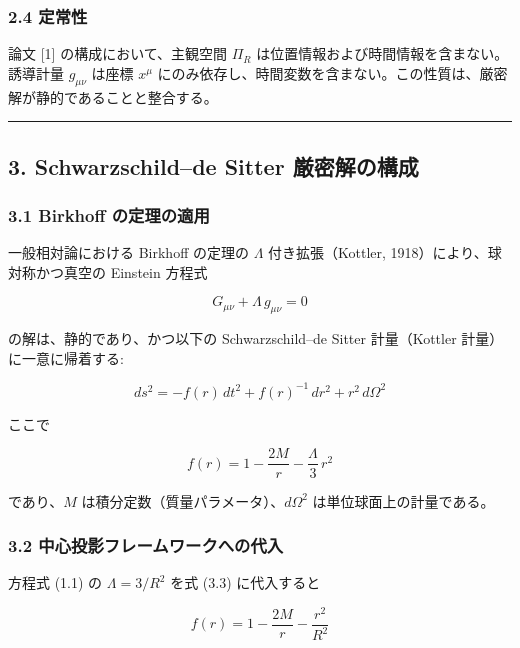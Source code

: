 \documentclass[a4paper,11pt]{ltjsarticle}
\theoremstyle{definition}
\begin{document}
\subsubsection{2.4 定常性}\label{ux5b9aux5e38ux6027}

論文 {[}1{]} の構成において、主観空間 \(\Pi_R\)
は位置情報および時間情報を含まない。誘導計量 \(g_{\mu\nu}\) は座標
\(x^\mu\)
にのみ依存し、時間変数を含まない。この性質は、厳密解が静的であることと整合する。

\begin{center}\rule{0.5\linewidth}{0.5pt}\end{center}

\subsection{3. Schwarzschild--de Sitter
厳密解の構成}\label{schwarzschildde-sitter-ux53b3ux5bc6ux89e3ux306eux69cbux6210}

\subsubsection{3.1 Birkhoff
の定理の適用}\label{birkhoff-ux306eux5b9aux7406ux306eux9069ux7528}

一般相対論における Birkhoff の定理の \(\Lambda\) 付き拡張（Kottler,
1918）により、球対称かつ真空の Einstein 方程式

\[G_{\mu\nu} + \Lambda\, g_{\mu\nu} = 0 \tag{3.1}\]

の解は、静的であり、かつ以下の Schwarzschild--de Sitter 計量（Kottler
計量）に一意に帰着する:

\[ds^2 = -f(r)\,dt^2 + f(r)^{-1}\,dr^2 + r^2\,d\Omega^2 \tag{3.2}\]

ここで

\[f(r) = 1 - \frac{2M}{r} - \frac{\Lambda}{3}\,r^2 \tag{3.3}\]

であり、\(M\) は積分定数（質量パラメータ）、\(d\Omega^2\)
は単位球面上の計量である。

\subsubsection{3.2
中心投影フレームワークへの代入}\label{ux4e2dux5fc3ux6295ux5f71ux30d5ux30ecux30fcux30e0ux30efux30fcux30afux3078ux306eux4ee3ux5165}

方程式 (1.1) の \(\Lambda = 3/R^2\) を式 (3.3) に代入すると

\[f(r) = 1 - \frac{2M}{r} - \frac{r^2}{R^2} \tag{3.4}\]
\end{document}
